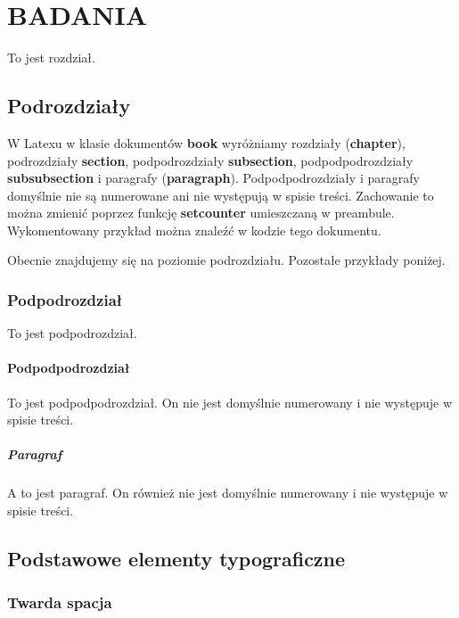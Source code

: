 \chapter{BADANIA}

To jest rozdział.

\section{Podrozdziały}

W Latexu w klasie dokumentów \textbf{book} wyróżniamy rozdziały (\textbf{chapter}), podrozdziały \textbf{section}, podpodrozdziały \textbf{subsection}, podpodpodrozdziały \textbf{subsubsection} i paragrafy (\textbf{paragraph}). Podpodpodrozdziały i paragrafy domyślnie nie są numerowane ani nie występują w spisie treści. Zachowanie to można zmienić poprzez funkcję \textbf{setcounter} umieszczaną w preambule. Wykomentowany przykład można znaleźć w kodzie tego dokumentu.

Obecnie znajdujemy się na poziomie podrozdziału. Pozostałe przykłady poniżej.

\subsection{Podpodrozdział}

To jest podpodrozdział.

\subsubsection{Podpodpodrozdział}

To jest podpodpodrozdział. On nie jest domyślnie numerowany i nie występuje w spisie treści.

\paragraph{Paragraf}

A to jest paragraf. On również nie jest domyślnie numerowany i nie występuje w spisie treści.

\section{Podstawowe elementy typograficzne}

\subsection{Twarda spacja}

